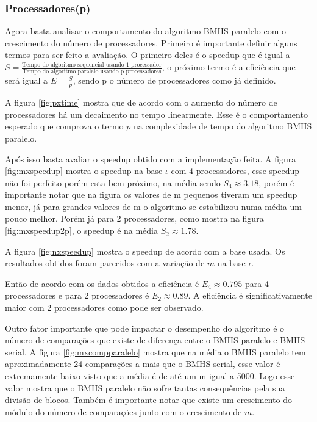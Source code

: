 \documentclass[11pt]{article}
\begin{document}
\subsubsection{Processadores(p)}
\label{sec:org2badbbd}

Agora basta analisar o comportamento do algoritmo BMHS paralelo com o crescimento do número de processadores. Primeiro é importante definir alguns termos para ser feito a avaliação. O primeiro deles é o speedup que é igual a \(S=\frac{\text{Tempo do algoritmo sequencial usando 1 processador}}{\text{Tempo do algoritmo paralelo usando p processadores}}\), o próximo termo é a eficiência que será igual a \(E=\frac{S}{p}\), sendo p o número de processadores como já definido.

A figura \ref{fig:pxtime} mostra que de acordo com o aumento do número de processadores há um decaimento no tempo linearmente. Esse é o comportamento esperado que comprova o termo \(p\) na complexidade de tempo do algoritmo BMHS paralelo. 

Após isso basta avaliar o speedup obtido com a implementação feita. A figura \ref{fig:mxspeedup} mostra o speedup na base \(\iota\) com 4 processadores, esse speedup não foi perfeito porém esta bem próximo, na média sendo \(S_{4}\approx 3.18\), porém é importante notar que na figura os valores de m pequenos tiveram um speedup menor, já para grandes valores de m o algoritmo se estabilizou numa média um pouco melhor. Porém já para 2 processadores, como mostra na figura \ref{fig:mxspeedup2p}, o speedup é na média \(S_{2}\approx 1.78\).

A figura \ref{fig:nxspeedup} mostra o speedup de acordo com a base usada. Os resultados obtidos foram parecidos com a variação de \(m\) na base \(\iota\).

Então de acordo com os dados obtidos a eficiência é \(E_{4}\approx 0.795\) para 4 processadores e para 2 processadores é \(E_{2}\approx 0.89\). A eficiência é significativamente maior com 2 processadores como pode ser observado.

Outro fator importante que pode impactar o desempenho do algoritmo é o número de comparações que existe de diferença entre o BMHS paralelo e BMHS serial. A figura \ref{fig:mxcompparalelo} mostra que na média o BMHS paralelo tem aproximadamente 24 comparações a mais que o BMHS serial, esse valor é extremamente baixo visto que a média é de até um m igual a 5000. Logo esse valor mostra que o BMHS paralelo não sofre tantas consequências pela sua divisão de blocos. Também é importante notar que existe um crescimento do módulo do número de comparações junto com o crescimento de \(m\).
\end{document}

